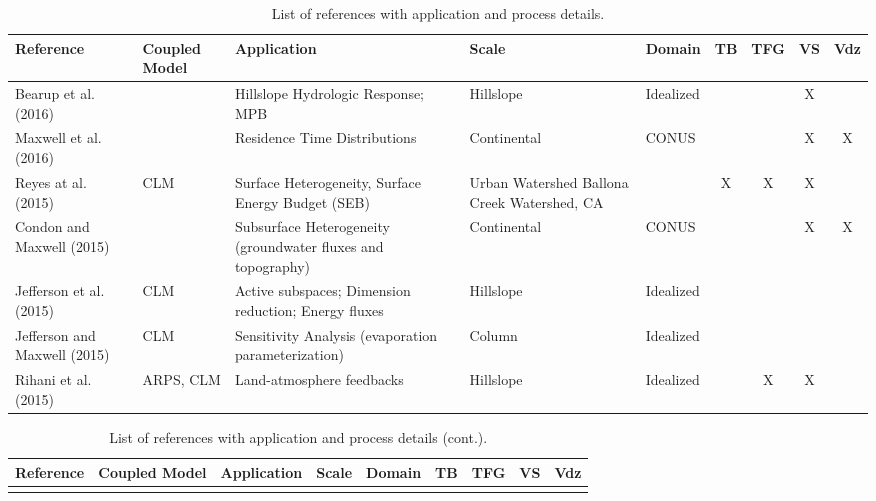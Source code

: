 {\scriptsize
\begin{table}
\renewcommand{\arraystretch}{2.5}
\center
\caption{List of \parflow{} references with application and process details.}
\begin{tabular}{ l  p{1.5cm} p{2cm} p{1.5cm} p{1.5cm} | c | c | c | c }
\bf{Reference} & \bf{Coupled Model} & \bf{Application} & \bf{Scale} & \bf{Domain} & \bf{TB} & \bf{TFG} & \bf{VS} & \bf{Vdz} \\ 
\hline{}

\cite{Bearup2016}   Bearup et al. (2016) & & Hillslope Hydrologic Response; MPB & Hillslope     & Idealized & & & X & \\
\cite{Maxwell2016} Maxwell et al. (2016) & & Residence Time Distributions       & Continental	& CONUS     & & & X & X \\	
\cite{Reyes2015} Reyes at al. (2015)     & CLM & Surface Heterogeneity, Surface Energy Budget (SEB) & Urban Watershed Ballona Creek Watershed, CA  & & X&X &X  \\
\cite{Condon2015a} Condon and Maxwell (2015) & & Subsurface Heterogeneity (groundwater fluxes and topography) & Continental & CONUS  & & & X & X \\
\cite{Jefferson2015} Jefferson et al. (2015) & CLM & Active subspaces; Dimension reduction; Energy fluxes & Hillslope & Idealized   & & & & \\ 				
\cite{Jefferson2015a} Jefferson and Maxwell (2015)& CLM & Sensitivity Analysis (evaporation parameterization) & Column & Idealized   & & & & \\ 				
\cite{Rihani2015} Rihani et al. (2015) & ARPS, CLM & Land-atmosphere feedbacks & Hillslope & Idealized      & & X & X & \\

\end{tabular}
\label{pfref16}
\end{table}


\begin{table}
\renewcommand{\arraystretch}{2.5}
\center
\caption{List of \parflow{} references with application and process details (cont.).}
\begin{tabular}{ l  p{1.5cm} p{2cm} p{1.5cm} p{1.5cm} | c | c | c | c }
\bf{Reference} & \bf{Coupled Model} & \bf{Application} & \bf{Scale} & \bf{Domain} & \bf{TB} & \bf{TFG} & \bf{VS} & \bf{Vdz} \\ 
\hline{}


\end{tabular}
\end{table}}
